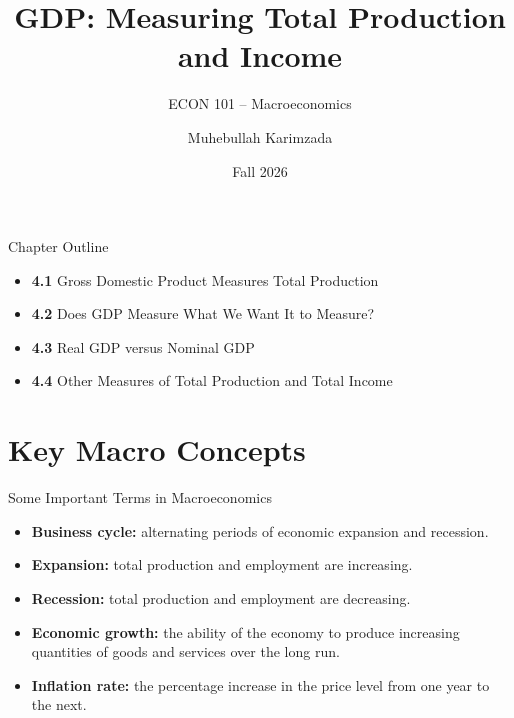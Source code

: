 \documentclass[aspectratio=169]{beamer}
\title{\textbf{GDP: Measuring Total Production and Income}}
\subtitle{{\large ECON 101 -- Macroeconomics}}
\author{Muhebullah Karimzada}
\date{Fall 2026}
\begin{document}

\begin{frame}[plain]
  \titlepage
\end{frame}

\begin{frame}{Chapter Outline}
\transfade
\begin{itemize}[<+->]
  \item \textbf{4.1} Gross Domestic Product Measures Total Production
  \item \textbf{4.2} Does GDP Measure What We Want It to Measure?
  \item \textbf{4.3} Real GDP versus Nominal GDP
  \item \textbf{4.4} Other Measures of Total Production and Total Income
\end{itemize}
\end{frame}

\section*{Key Macro Concepts}

\begin{frame}{Some Important Terms in Macroeconomics}
\transfade
\begin{itemize}[<+->]
  \item \textbf{Business cycle:} alternating periods of economic \alert{expansion} and \alert{recession}.
  \item \textbf{Expansion:} total production and employment are \alert{increasing}.
  \item \textbf{Recession:} total production and employment are \alert{decreasing}.
  \item \textbf{Economic growth:} the ability of the economy to produce increasing quantities of goods and services over the long run.
  \item \textbf{Inflation rate:} the \alert{percentage increase} in the price level from one year to the next.
\end{itemize}
\end{frame}
\end{document}
